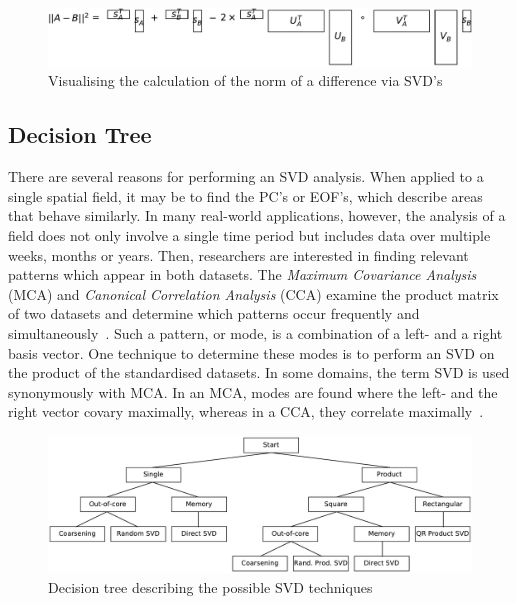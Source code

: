 \documentclass[ijgi,article,submit,moreauthors,pdftex,10pt,a4paper]{Definitions/mdpi}
\begin{document}
\begin{figure}[H]
\centering
\includegraphics[width=130mm]{Results/normDifferenceFromUSVs.pdf}
\caption[Exact norm of difference]{Visualising the calculation of the norm of a difference via SVD's}
\label{fig:normDifferenceFromUSVs}
\end{figure}

\subsection{Decision Tree}
\label{sec:Introduction/Decision Tree}

There are several reasons for performing an SVD analysis. When applied to a single spatial field, it may be to find the PC's or EOF's, which describe areas that behave similarly. In many real-world applications, however, the analysis of a field does not only involve a single time period but includes data over multiple weeks, months or years. Then, researchers are interested in finding relevant patterns which appear in both datasets. The \textit{Maximum Covariance Analysis} (MCA) and \textit{Canonical Correlation Analysis} (CCA) examine the product matrix of two datasets and determine which patterns occur frequently and simultaneously~\cite{Eshel2011, Storch1999}. Such a pattern, or mode, is a combination of a left- and a right basis vector. One technique to determine these modes is to perform an SVD on the product of the standardised datasets. In some domains, the term SVD is used synonymously with MCA. In an MCA, modes are found where the left- and the right vector covary maximally, whereas in a CCA, they correlate maximally~\cite{Bretherton1992}.

\begin{figure}[H]
\centering
\includegraphics[width=\textwidth]{Results/FlowDiagram.pdf}
\caption{Decision tree describing the possible SVD techniques}
\label{fig:FlowDiagram}
\end{figure}
\end{document}
